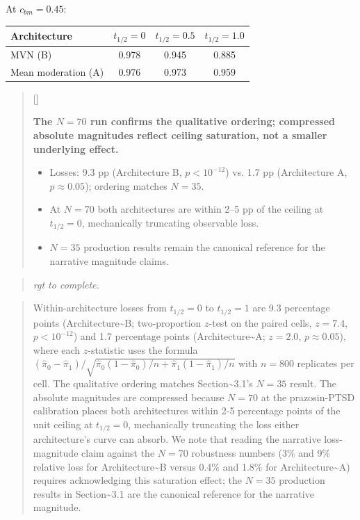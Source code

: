 \documentclass[
  11pt,
]{article}
\newcounter{pgraph}
\newenvironment{bullets}{%
  \stepcounter{pgraph}%
  \begin{quote}\small\sffamily\color[gray]{0.30}%
  {\normalfont\scriptsize\color[gray]{0.58}[\thepgraph]\enspace}}{%
  \end{quote}}
\newenvironment{rgt}{%
  \begin{quote}\small\itshape\color[RGB]{20,60,160}}{%
  \end{quote}}
\newenvironment{orig}{%
  \begin{quote}\normalsize\color[gray]{0.55}}{%
  \end{quote}}
\begin{document}
At \(c_{bm} = 0.45\):

\begin{table}[htbp]
\centering
\begin{tabular}{lccc}
\toprule
Architecture        & $t_{1/2} = 0$ & $t_{1/2} = 0.5$ & $t_{1/2} = 1.0$ \\
\midrule
MVN (B)             & 0.978         & 0.945           & 0.885 \\
Mean moderation (A) & 0.976         & 0.973           & 0.959 \\
\bottomrule
\end{tabular}
\end{table}

\begin{bullets}

\textbf{The $N = 70$ run confirms the qualitative ordering;
compressed absolute magnitudes reflect ceiling saturation,
not a smaller underlying effect.}

\begin{itemize}\setlength{\itemsep}{2pt}\setlength{\parskip}{0pt}
\item Losses: 9.3 pp (Architecture B, $p < 10^{-12}$) vs.
  1.7 pp (Architecture A, $p \approx 0.05$); ordering matches
  $N = 35$.
\item At $N = 70$ both architectures are within 2--5 pp of the
  ceiling at $t_{1/2} = 0$, mechanically truncating observable
  loss.
\item $N = 35$ production results remain the canonical
  reference for the narrative magnitude claims.
\end{itemize}

\end{bullets}

\begin{rgt}
rgt to complete.

\end{rgt}

\begin{orig}
Within-architecture losses from \(t_{1/2} = 0\) to \(t_{1/2} = 1\) are
9.3 percentage points (Architecture\textasciitilde B; two-proportion
\(z\)-test on the paired cells, \(z = 7.4\), \(p < 10^{-12}\)) and 1.7
percentage points (Architecture\textasciitilde A; \(z = 2.0\),
\(p \approx 0.05\)), where each \(z\)-statistic uses the formula
\((\hat{\pi}_0 - \hat{\pi}_1) /
\sqrt{\hat{\pi}_0(1-\hat{\pi}_0)/n + \hat{\pi}_1(1-\hat{\pi}_1)/n}\)
with \(n = 800\) replicates per cell. The qualitative ordering matches
Section\textasciitilde3.1's \(N = 35\) result. The absolute magnitudes
are compressed because \(N = 70\) at the prazosin-PTSD calibration
places both architectures within 2-5 percentage points of the unit
ceiling at \(t_{1/2} = 0\), mechanically truncating the loss either
architecture's curve can absorb. We note that reading the narrative
loss-magnitude claim against the \(N = 70\) robustness numbers (3\% and
9\% relative loss for Architecture\textasciitilde B versus 0.4\% and
1.8\% for Architecture\textasciitilde A) requires acknowledging this
saturation effect; the \(N = 35\) production results in
Section\textasciitilde3.1 are the canonical reference for the narrative
magnitude.

\end{orig}
\end{document}
